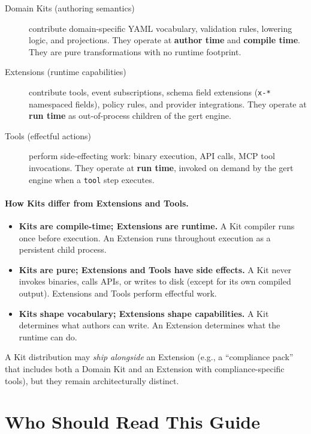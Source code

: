 \begin{description}
  \item[Domain Kits (authoring semantics)] contribute domain-specific YAML
    vocabulary, validation rules, lowering logic, and projections. They operate
    at \textbf{author time} and \textbf{compile time}. They are pure
    transformations with no runtime footprint.

  \item[Extensions (runtime capabilities)] contribute tools, event
    subscriptions, schema field extensions (\texttt{x-*} namespaced fields),
    policy rules, and provider integrations. They operate at \textbf{run time}
    as out-of-process children of the gert engine.

  \item[Tools (effectful actions)] perform side-effecting work: binary
    execution, API calls, MCP tool invocations. They operate at \textbf{run
    time}, invoked on demand by the gert engine when a \texttt{tool} step
    executes.
\end{description}

\paragraph{How Kits differ from Extensions and Tools.}

\begin{itemize}
  \item \textbf{Kits are compile-time; Extensions are runtime.} A Kit compiler
    runs once before execution. An Extension runs throughout execution as a
    persistent child process.
  \item \textbf{Kits are pure; Extensions and Tools have side effects.} A Kit
    never invokes binaries, calls APIs, or writes to disk (except for its own
    compiled output). Extensions and Tools perform effectful work.
  \item \textbf{Kits shape vocabulary; Extensions shape capabilities.} A Kit
    determines what authors can write. An Extension determines what the runtime
    can do.
\end{itemize}

A Kit distribution may \emph{ship alongside} an Extension (e.g., a ``compliance
pack'' that includes both a Domain Kit and an Extension with compliance-specific
tools), but they remain architecturally distinct.

\section{Who Should Read This Guide}
\label{sec:audience}

